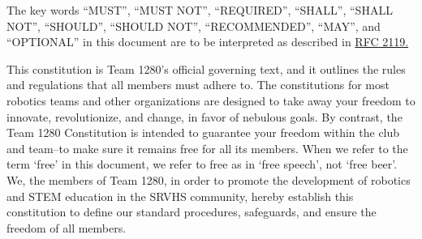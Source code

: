 \documentclass{sga-bill}
\author{Youwen Wu}
\date{\today}
\begin{document}
\maketitle


\vspace{12pt}
\linebreak
\small{The key words “MUST”, “MUST NOT”, “REQUIRED”, “SHALL”, “SHALL NOT”, “SHOULD”, “SHOULD NOT”, “RECOMMENDED”, “MAY”, and “OPTIONAL” in this document are to be interpreted as described in \href{https://datatracker.ietf.org/doc/html/rfc2119}{RFC 2119.}}


\begin{adjustwidth}{80pt}{80pt}
  \normalsize{
    This constitution is Team 1280's official governing text, and it outlines the rules and regulations that all members must adhere to.
    The constitutions for most robotics teams and other organizations are designed to take away your freedom to innovate, revolutionize, and change, in favor of nebulous goals. By contrast, the Team 1280 Constitution is intended to guarantee your freedom within the club and team--to make sure it remains free for all its members.
    When we refer to the term `free' in this document, we refer to free as in `free speech', not `free beer'.
    We, the members of Team 1280, in order to promote the development of robotics and STEM education in the SRVHS community, hereby establish this constitution to define our standard procedures, safeguards, and ensure the freedom of all members.
  }
\end{adjustwidth}

\normalsize
\vspace{12pt}
\vspace{12pt}



\end{document}
